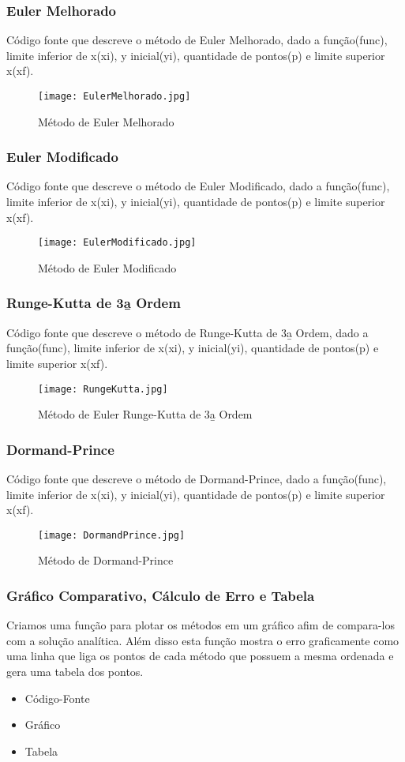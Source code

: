 \documentclass{article}
\begin{document}
		\subsubsection{Euler Melhorado}
		C\'odigo fonte que descreve o m\'etodo de Euler Melhorado, dado a fun\c c\~ao(func), limite inferior de x(xi), 
		y inicial(yi), quantidade de pontos(p) e limite superior x(xf).
			\begin{figure}[h!]
			\texttt{[image: EulerMelhorado.jpg]}
			\caption{M\'etodo de Euler Melhorado}
			\end{figure}
\newpage
		\subsubsection{Euler Modificado}
		C\'odigo fonte que descreve o m\'etodo de Euler Modificado, dado a fun\c c\~ao(func), limite inferior de x(xi), 
		y inicial(yi), quantidade de pontos(p) e limite superior x(xf).
			\begin{figure}[h!]
			\texttt{[image: EulerModificado.jpg]}
			\caption{M\'etodo de Euler Modificado}
			\end{figure}
		\subsubsection{Runge-Kutta de 3\b a Ordem}
		C\'odigo fonte que descreve o m\'etodo de Runge-Kutta de 3\b a Ordem, dado a fun\c c\~ao(func), limite inferior de x(xi), 
		y inicial(yi), quantidade de pontos(p) e limite superior x(xf).
			\begin{figure}[h!]
			\texttt{[image: RungeKutta.jpg]}
			\caption{M\'etodo de Euler Runge-Kutta de 3\b a Ordem}
			\end{figure}
\newpage
		\subsubsection{Dormand-Prince}
		C\'odigo fonte que descreve o m\'etodo de Dormand-Prince, dado a fun\c c\~ao(func), limite inferior de x(xi), 
		y inicial(yi), quantidade de pontos(p) e limite superior x(xf).
			\begin{figure}[h!]
			\texttt{[image: DormandPrince.jpg]}
			\caption{M\'etodo de Dormand-Prince}
			\end{figure}
		\subsubsection{Gr\'afico Comparativo, C\'alculo de Erro e Tabela}
		Criamos uma fun\c c\~ao para plotar os m\'etodos em um gr\'afico afim de compara-los com a solu\c c\~ao anal\'itica. 
		Al\'em disso esta fun\c c\~ao mostra o erro graficamente como uma linha que liga os pontos de cada m\'etodo 
		que possuem a mesma ordenada e gera uma tabela dos pontos.
		\begin{itemize}
		\item C\'odigo-Fonte
		\item Gr\'afico
		\item Tabela
		\end{itemize}
\end{document}
